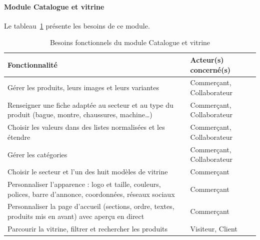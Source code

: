 \paragraph{Module Catalogue et vitrine}
Le tableau~\ref{tab:besoins-catalogue} présente les besoins de ce module.
\begin{table}[H]
\centering
\renewcommand{\arraystretch}{1.3}
\begin{tabular}{|p{9.5cm}|p{5.5cm}|}
\hline
\textbf{Fonctionnalité} & \textbf{Acteur(s) concerné(s)} \\
\hline
Gérer les produits, leurs images et leurs variantes & Commerçant, Collaborateur \\
\hline
Renseigner une fiche adaptée au secteur et au type du produit (bague, montre, chaussures, machine\dots) & Commerçant, Collaborateur \\
\hline
Choisir les valeurs dans des listes normalisées et les étendre & Commerçant, Collaborateur \\
\hline
Gérer les catégories & Commerçant, Collaborateur \\
\hline
Choisir le secteur et l'un des huit modèles de vitrine & Commerçant \\
\hline
Personnaliser l'apparence : logo et taille, couleurs, polices, barre d'annonce, coordonnées, réseaux sociaux & Commerçant \\
\hline
Personnaliser la page d'accueil (sections, ordre, textes, produits mis en avant) avec aperçu en direct & Commerçant \\
\hline
Parcourir la vitrine, filtrer et rechercher les produits & Visiteur, Client \\
\hline
\end{tabular}
\caption{Besoins fonctionnels du module Catalogue et vitrine}
\label{tab:besoins-catalogue}
\end{table}

